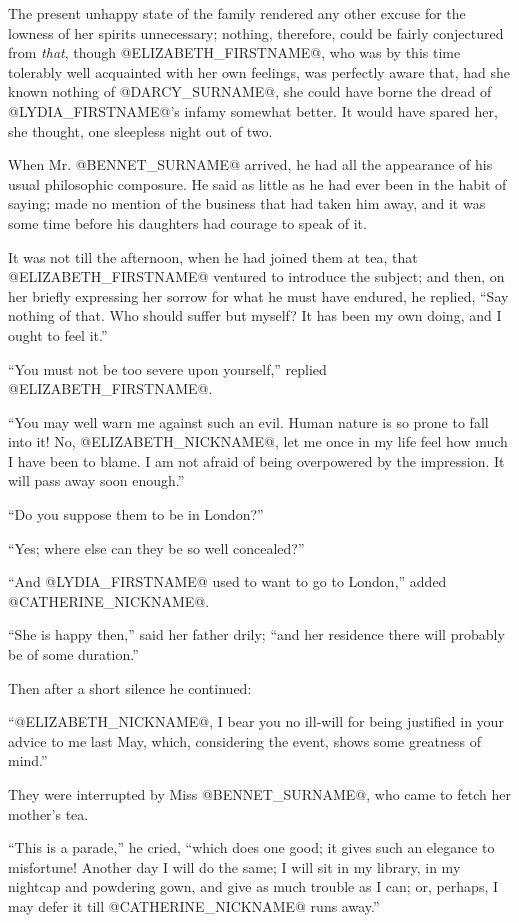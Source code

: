 The present unhappy state of the family rendered any other excuse for
the lowness of her spirits unnecessary; nothing, therefore, could be
fairly conjectured from \textit{that}, though @ELIZABETH_FIRSTNAME@, who was by this time
tolerably well acquainted with her own feelings, was perfectly aware
that, had she known nothing of @DARCY_SURNAME@, she could have borne the dread of
@LYDIA_FIRSTNAME@'s infamy somewhat better. It would have spared her, she thought,
one sleepless night out of two.

When Mr. @BENNET_SURNAME@ arrived, he had all the appearance of his usual
philosophic composure. He said as little as he had ever been in the
habit of saying; made no mention of the business that had taken him
away, and it was some time before his daughters had courage to speak of
it.

It was not till the afternoon, when he had joined them at tea, that
@ELIZABETH_FIRSTNAME@ ventured to introduce the subject; and then, on her briefly
expressing her sorrow for what he must have endured, he replied, ``Say
nothing of that. Who should suffer but myself? It has been my own doing,
and I ought to feel it.''

``You must not be too severe upon yourself,'' replied @ELIZABETH_FIRSTNAME@.

``You may well warn me against such an evil. Human nature is so prone
to fall into it! No, @ELIZABETH_NICKNAME@, let me once in my life feel how much I have
been to blame. I am not afraid of being overpowered by the impression.
It will pass away soon enough.''

``Do you suppose them to be in London?''

``Yes; where else can they be so well concealed?''

``And @LYDIA_FIRSTNAME@ used to want to go to London,'' added @CATHERINE_NICKNAME@.

``She is happy then,'' said her father drily; ``and her residence there
will probably be of some duration.''

Then after a short silence he continued:

``@ELIZABETH_NICKNAME@, I bear you no ill-will for being justified in your advice to me
last May, which, considering the event, shows some greatness of mind.''

They were interrupted by Miss @BENNET_SURNAME@, who came to fetch her mother's
tea.

``This is a parade,'' he cried, ``which does one good; it gives such an
elegance to misfortune! Another day I will do the same; I will sit in my
library, in my nightcap and powdering gown, and give as much trouble as
I can; or, perhaps, I may defer it till @CATHERINE_NICKNAME@ runs away.''

